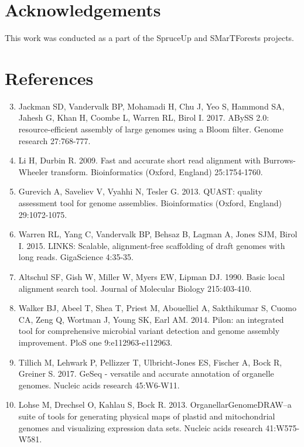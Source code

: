 \documentclass[titlepage,11pt, oneside]{article}   	%
\begin{document}
\section*{Acknowledgements}
This work was conducted as a part of the SpruceUp and SMarTForests projects.

\section*{References}

\begin{enumerate}
\setcounter{enumi}{2}
\item Jackman SD, Vandervalk BP, Mohamadi H, Chu J, Yeo S, Hammond SA, Jahesh G, Khan H, Coombe L, Warren RL, Birol I. 2017. ABySS 2.0: resource-efficient assembly of large 
genomes using a Bloom filter. Genome research 27:768-777.
\item Li H, Durbin R. 2009. Fast and accurate short read alignment with Burrows-Wheeler transform. Bioinformatics (Oxford, England) 25:1754-1760.
\item Gurevich A, Saveliev V, Vyahhi N, Tesler G. 2013. QUAST: quality assessment tool for genome assemblies. Bioinformatics (Oxford, England) 29:1072-1075.
\item Warren RL, Yang C, Vandervalk BP, Behsaz B, Lagman A, Jones SJM, Birol I. 2015. LINKS: Scalable, alignment-free scaffolding of draft genomes with long reads. GigaScience 4:35-35.
\item Altschul SF, Gish W, Miller W, Myers EW, Lipman DJ. 1990. Basic local alignment search tool. Journal of Molecular Biology 215:403-410.
\item Walker BJ, Abeel T, Shea T, Priest M, Abouelliel A, Sakthikumar S, Cuomo CA, Zeng Q, Wortman J, Young SK, Earl AM. 2014. Pilon: an integrated tool for comprehensive microbial variant detection and genome assembly improvement. PloS one 9:e112963-e112963.
\item Tillich M, Lehwark P, Pellizzer T, Ulbricht-Jones ES, Fischer A, Bock R, Greiner S. 2017. GeSeq - versatile and accurate annotation of organelle genomes. Nucleic acids research 45:W6-W11.
\item Lohse M, Drechsel O, Kahlau S, Bock R. 2013. OrganellarGenomeDRAW--a suite of tools for generating physical maps of plastid and mitochondrial genomes and visualizing expression data sets. Nucleic acids research 41:W575-W581.
\end{enumerate}
\end{document}
